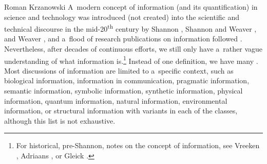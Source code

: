 \begin{artengenv}{Roman Krzanowski}
\lettrine[loversize=0.13,lines=2,lraise=-0.03,nindent=0em,findent=0.2pt]%
{A}{}~modern concept of information (and its quantification) in science and technology was introduced (not created) into the scientific and technical discourse in the mid-20\textsuperscript{th} century by Shannon 
\parencite*[][]{shannon_mathematical_1948}, %
 Shannon and Weaver 
\parencites*[][]{ShannonWeaver1949}[][]{ShannonWeaver1998}, %
 and Weaver 
\parencite*[][]{weaver_mathematics_1949}, %
 and a~flood of research publications on information followed 
\parencite[e.g.,][]{carvalho_60_2009}. %
 Nevertheless, after decades of continuous efforts, we still only have a~rather vague understanding of what information is.\footnote{For historical, pre-Shannon, notes on the concept of information, see Vreeken 
\parencite*[][]{vreeken_history_2005}, %
 Adriaans 
\parencite*[][]{adriaans_information_2020}, %
 or Gleick 
\parencite*[][]{gleick_information_2011}.%
} Instead of one definition, we have many 
\parencites[e.g.,][]{adriaans_information_2020}[][]{krzanowski_ontological_2022}. %
 Most discussions of information are limited to a~specific context, such as biological information, information in communication, pragmatic information, semantic information, symbolic information, synthetic information, physical information, quantum information, natural information, environmental information, or structural information with variants in each of the classes, although this list is not exhaustive.




\end{artengenv}
